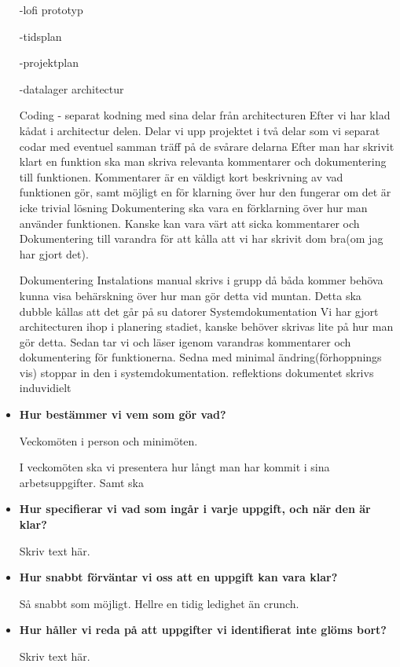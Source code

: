 \documentclass{mall}
\begin{document}
\begin{itemize}
  -lofi prototyp
  
  -tidsplan 
  
  -projektplan 
  
  -datalager architectur

  Coding - separat kodning med sina delar från architecturen
  Efter vi har klad kådat i architectur delen. Delar vi upp projektet i två delar som vi separat codar med eventuel samman träff på de svårare delarna
  Efter man har skrivit klart en funktion ska man skriva relevanta kommentarer och dokumentering till funktionen.
  Kommentarer är en väldigt kort beskrivning av vad funktionen gör, samt möjligt en för klarning över hur den fungerar om det är icke trivial lösning
  Dokumentering ska vara en förklarning över hur man använder funktionen.
  Kanske kan vara värt att sicka kommentarer och Dokumentering till varandra för att kålla att vi har skrivit dom bra(om jag har gjort det). 


  Dokumentering
  Instalations manual skrivs i grupp då båda kommer behöva kunna visa behärskning över hur man gör detta vid muntan. Detta ska dubble kållas att det går på su datorer
  Systemdokumentation Vi har gjort architecturen ihop i planering stadiet, kanske behöver skrivas lite på hur man gör detta.
  Sedan tar vi och läser igenom varandras kommentarer och dokumentering för funktionerna.
  Sedna med minimal ändring(förhoppnings vis) stoppar in den i systemdokumentation.
  reflektions dokumentet skrivs induvidielt 

\item \textbf{Hur bestämmer vi vem som gör vad?}

  Veckomöten i person och minimöten.
  
  I veckomöten ska vi presentera hur långt man har kommit i sina arbetsuppgifter. Samt ska   

\item \textbf{Hur specifierar vi vad som ingår i varje uppgift, och när den är klar?}

  Skriv text här.

\item \textbf{Hur snabbt förväntar vi oss att en uppgift kan vara klar?}

  Så snabbt som möjligt. Hellre en tidig ledighet än crunch.

\item \textbf{Hur håller vi reda på att uppgifter vi identifierat inte glöms bort?}

  Skriv text här.

\end{itemize}
\end{document}
